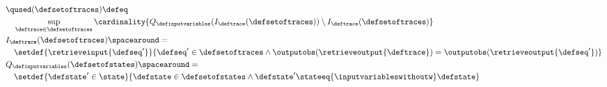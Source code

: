 \begin{align*}
  & \qused(\defsetoftraces) \defeq \\
  &\quad\sup_{\deftrace \in \defsetoftraces}
  \cardinality{
      Q_\definputvariables(I_\deftrace(\defsetoftraces)) \setminus I_\deftrace(\defsetoftraces)
    } \\
    & I_{\deftrace}(\defsetoftraces) \spacearound= \\
    &\quad \setdef{
      \retrieveinput{\defseq'}
    }{
      \defseq' \in \defsetoftraces \land
      \outputobs(\retrieveoutput{\deftrace}) = \outputobs(\retrieveoutput{\defseq'})
    } \\
    & Q_\definputvariables(\defsetofstates) \spacearound= \\
    &\quad \setdef{
      \defstate' \in \state
    }{
      \defstate \in \defsetofstates \land
        \defstate' \stateeq{\inputvariableswithoutw} \defstate
    }
\end{align*}
